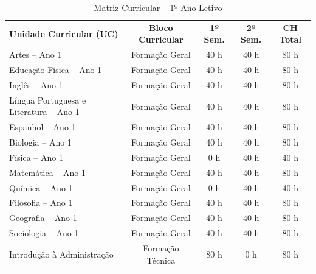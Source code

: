 

\begin{table}[H]
\centering
\small
\caption{Matriz Curricular -- 1º Ano Letivo}
\label{qua:matriz-ano1}
\vspace{0.2cm}
\begin{tabularx}{\linewidth}{|X|c|c|c|c|}
\hline
\rowcolor{ifscgreen!20}
\multicolumn{5}{|c|}{\textbf{\large 1º ANO LETIVO (SEMESTRES 1 E 2)}} \\ \hline
\rowcolor{cinzaTabela}
\textbf{Unidade Curricular (UC)} & \textbf{Bloco Curricular} & \textbf{1º Sem.} & \textbf{2º Sem.} & \textbf{CH Total} \\ \hline
Artes -- Ano 1 & Formação Geral & 40 h & 40 h & 80 h \\ \hline
Educação Física -- Ano 1 & Formação Geral & 40 h & 40 h & 80 h \\ \hline
Inglês -- Ano 1 & Formação Geral & 40 h & 40 h & 80 h \\ \hline
Língua Portuguesa e Literatura -- Ano 1 & Formação Geral & 40 h & 40 h & 80 h \\ \hline
Espanhol -- Ano 1\revisao{*} & Formação Geral & 40 h & 40 h & 80 h \\ \hline
Biologia -- Ano 1 & Formação Geral & 40 h & 40 h & 80 h \\ \hline
Física -- Ano 1 & Formação Geral & 0 h & 40 h & 40 h \\ \hline
Matemática -- Ano 1 & Formação Geral & 40 h & 40 h & 80 h \\ \hline
Química -- Ano 1 & Formação Geral & 0 h & 40 h & 40 h \\ \hline
Filosofia -- Ano 1 & Formação Geral & 40 h & 40 h & 80 h \\ \hline
Geografia -- Ano 1 & Formação Geral & 40 h & 40 h & 80 h \\ \hline
Sociologia -- Ano 1 & Formação Geral & 40 h & 40 h & 80 h \\ \hline
Introdução à Administração & Formação Técnica & 80 h & 0 h & 80 h \\ \hline

\end{tabularx}
\end{table}
